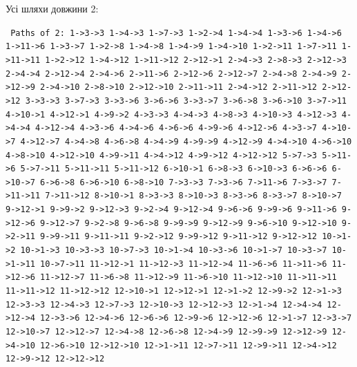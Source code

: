 \begin{framed}
  \noindent%
  Усі шляхи довжини 2:\\
  \raggedright\footnotesize\texttt{%
    Paths of 2: 1->3->3 1->4->3 1->7->3 1->2->4 1->4->4 1->3->6 1->4->6 1->11->6 1->3->7 1->2->8 1->4->8 1->4->9 1->4->10 1->2->11 1->7->11 1->11->11 1->2->12 1->4->12 1->11->12 2->12->1 2->4->3 2->8->3 2->12->3 2->4->4 2->12->4 2->4->6 2->11->6 2->12->6 2->12->7 2->4->8 2->4->9 2->12->9 2->4->10 2->8->10 2->12->10 2->11->11 2->4->12 2->11->12 2->12->12 3->3->3 3->7->3 3->3->6 3->6->6 3->3->7 3->6->8 3->6->10 3->7->11 4->10->1 4->12->1 4->9->2 4->3->3 4->4->3 4->8->3 4->10->3 4->12->3 4->4->4 4->12->4 4->3->6 4->4->6 4->6->6 4->9->6 4->12->6 4->3->7 4->10->7 4->12->7 4->4->8 4->6->8 4->4->9 4->9->9 4->12->9 4->4->10 4->6->10 4->8->10 4->12->10 4->9->11 4->4->12 4->9->12 4->12->12 5->7->3 5->11->6 5->7->11 5->11->11 5->11->12 6->10->1 6->8->3 6->10->3 6->6->6 6->10->7 6->6->8 6->6->10 6->8->10 7->3->3 7->3->6 7->11->6 7->3->7 7->11->11 7->11->12 8->10->1 8->3->3 8->10->3 8->3->6 8->3->7 8->10->7 9->12->1 9->9->2 9->12->3 9->2->4 9->12->4 9->6->6 9->9->6 9->11->6 9->12->6 9->12->7 9->2->8 9->6->8 9->9->9 9->12->9 9->6->10 9->12->10 9->2->11 9->9->11 9->11->11 9->2->12 9->9->12 9->11->12 9->12->12 10->1->2 10->1->3 10->3->3 10->7->3 10->1->4 10->3->6 10->1->7 10->3->7 10->1->11 10->7->11 11->12->1 11->12->3 11->12->4 11->6->6 11->11->6 11->12->6 11->12->7 11->6->8 11->12->9 11->6->10 11->12->10 11->11->11 11->11->12 11->12->12 12->10->1 12->12->1 12->1->2 12->9->2 12->1->3 12->3->3 12->4->3 12->7->3 12->10->3 12->12->3 12->1->4 12->4->4 12->12->4 12->3->6 12->4->6 12->6->6 12->9->6 12->12->6 12->1->7 12->3->7 12->10->7 12->12->7 12->4->8 12->6->8 12->4->9 12->9->9 12->12->9 12->4->10 12->6->10 12->12->10 12->1->11 12->7->11 12->9->11 12->4->12 12->9->12 12->12->12 
  }
\end{framed}
